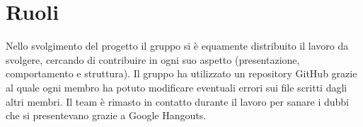 \section{Ruoli}
Nello svolgimento del progetto il gruppo si è equamente distribuito il lavoro da svolgere, cercando di contribuire in ogni suo aspetto (presentazione, comportamento e struttura).
Il gruppo ha utilizzato un repository GitHub grazie al quale ogni membro ha potuto modificare eventuali errori sui file scritti dagli altri membri. Il team è rimasto in contatto durante il lavoro per sanare i dubbi che si presentevano grazie a Google Hangouts.